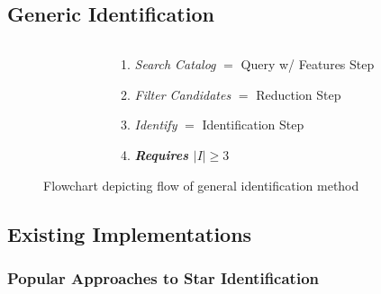 \documentclass[11pt]{beamer}
\begin{document}
    \subsection{Generic Identification}\label{subsec:genericIdentification}
    \begin{frame}
        \begin{figure}
            \begin{columns}
                \begin{column}{0.4\linewidth}
                    \centering{\scalebox{.53}{}}
                \end{column}
                \begin{column}{0.6\linewidth}
                    \caption{Flowchart depicting flow of general identification method} \bigskip
                    \begin{enumerate}
                        \item \textit{Search Catalog} $=$ Query w/ Features Step \medskip
                        \item \textit{Filter Candidates} $=$ Reduction Step \medskip
                        \item \textit{Identify} $=$ Identification Step \medskip
                        \item \textit{\textbf{Requires $|I| \geq 3$}} \medskip
                    \end{enumerate}
                \end{column}
            \end{columns}
        \end{figure}
    \end{frame}

    \subsection{Existing Implementations}\label{subsec:existingImplementations}
    \begin{frame}
        \frametitle{Popular Approaches to Star Identification}
        \begin{table}
            \centering{\tiny\hspace*{-10pt}} \bigskip \bigskip
        \end{table}
    \end{frame}
\end{document}
